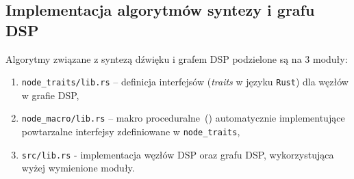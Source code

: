 \subsection{Implementacja algorytmów syntezy i grafu DSP}

Algorytmy związane z syntezą dźwięku i grafem DSP podzielone są na 3 moduły:

\begin{enumerate}
  \item \texttt{node\_traits/lib.rs} -- definicja interfejsów (\textit{traits} w języku \texttt{Rust}) dla węzłów w grafie DSP,
  \item \texttt{node\_macro/lib.rs} -- makro proceduralne~(\cite{proc_macro}) automatycznie implementujące powtarzalne interfejsy zdefiniowane w \texttt{node\_traits},
  \item \texttt{src/lib.rs} - implementacja węzłów DSP oraz grafu DSP, wykorzystująca wyżej wymienione moduły.
\end{enumerate}


